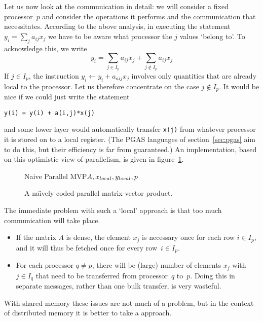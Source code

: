 Let us now look at the communication in detail: we will consider a
fixed processor~$p$ and consider the operations it performs and the
communication that necessitates.
According to the above analysis,
in executing the statement $y_i=\sum_ja_{ij}x_j$ we have
to be aware what processor the $j$ values `belong to'. To acknowledge
this, we write
\begin{equation}
  y_i=\sum_{j\in I_p}a_{ij}x_j+\sum_{j\not\in I_p}a_{ij}x_j
  \label{eq:yi=sum-in-and-not}
\end{equation}
If $j\in I_p$, the instruction $y_i \leftarrow y_i + a_{aij} x_j$
involves only quantities that are already local to
the processor.
Let us therefore concentrate on the case
$j\not\in I_p$.
It would be nice if we could just write the statement
\begin{verbatim}
y(i) = y(i) + a(i,j)*x(j)
\end{verbatim}
and some lower layer would automatically transfer \verb+x(j)+ from
whatever processor it is stored on to a local register. (The PGAS
languages of section~\ref{sec:pgas} aim to do this, but their
efficiency is far from guaranteed.) An implementation, based on this
optimistic view of parallelism, is given in figure~\ref{fig:naive-pmvp}.

\begin{figure}
  \begin{displayprocedure}{Naive Parallel MVP}{$A,x_{\mathrm\scriptstyle local},y_{\mathrm\scriptstyle local},p$}
  \end{displayprocedure}
  \caption{A na\"\i vely coded parallel matrix-vector product.}
  \label{fig:naive-pmvp}
\end{figure}

The immediate problem with such a
`local' approach is that too much communication will take place.
\begin{itemize}
\item If the matrix $A$ is dense, the element $x_j$ is necessary once
  for each row $i\in I_p$, and it will thus be fetched once for every
  row~$i\in I_p$.
\item For each processor $q\not=p$, there will be (large) number of
  elements $x_j$ with $j\in I_q$ that need to be transferred from
  processor~$q$ to~$p$. Doing this in separate messages, rather than
  one bulk transfer, is very wasteful.
\end{itemize}
With shared memory these issues are not much of a problem, but in the
context of distributed memory it is better to take a
 approach.

